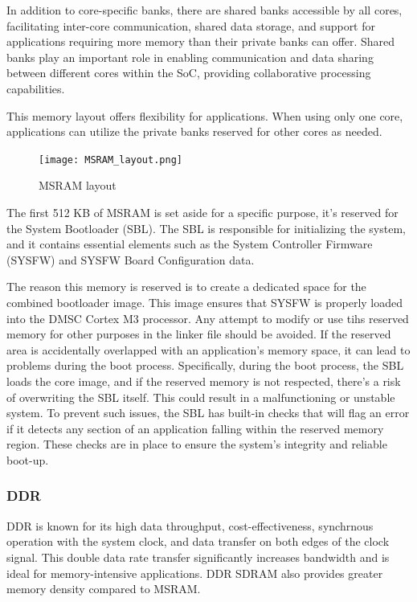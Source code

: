 In addition to core-specific banks, there are shared banks accessible by all
cores, facilitating inter-core communication, shared data storage, and support
for applications requiring more memory than their private banks can offer.
Shared banks play an important role in enabling communication and data sharing
between different cores within the SoC, providing collaborative processing
capabilities.

This memory layout offers flexibility for applications. When using only one
core, applications can utilize the private banks reserved for other cores as
needed.

\begin{figure}[H]
    \centering
    \texttt{[image: MSRAM\_layout.png]}
    \caption{MSRAM layout}
\end{figure}

The first 512 KB of MSRAM is set aside for a specific purpose, it's reserved
for the System Bootloader (SBL). The SBL is responsible for initializing the
system, and it contains essential elements such as the System Controller
Firmware (SYSFW) and SYSFW Board Configuration data.

The reason this memory is reserved is to create a dedicated space for the
combined bootloader image. This image ensures that SYSFW is properly loaded
into the DMSC Cortex M3 processor. Any attempt to modify or use tihs reserved
memory for other purposes in the linker file should be avoided. If the
reserved area is accidentally overlapped with an application's memory space,
it can lead to problems during the boot process.
Specifically, during the boot process, the SBL loads the core image, and if the
reserved memory is not respected, there's a risk of overwriting the SBL itself.
This could result in a malfunctioning or unstable system. To prevent such
issues, the SBL has built-in checks that will flag an error if it detects any
section of an application falling within the reserved memory region. These
checks are in place to ensure the system's integrity and reliable boot-up.

\subsubsection{DDR}

DDR is known for its high data throughput, cost-effectiveness, synchrnous
operation with the system clock, and data transfer on both edges of the clock
signal. This double data rate transfer significantly increases bandwidth and
is ideal for memory-intensive applications. DDR SDRAM also provides greater
memory density compared to MSRAM.

